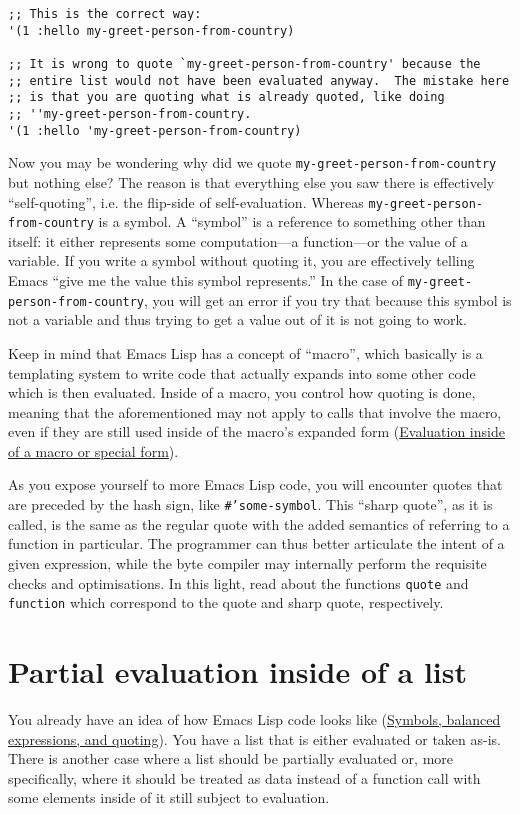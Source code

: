 \documentclass[11pt]{ctexart}
\begin{document}
\begin{verbatim}
;; This is the correct way:
'(1 :hello my-greet-person-from-country)

;; It is wrong to quote `my-greet-person-from-country' because the
;; entire list would not have been evaluated anyway.  The mistake here
;; is that you are quoting what is already quoted, like doing
;; ''my-greet-person-from-country.
'(1 :hello 'my-greet-person-from-country)
\end{verbatim}

Now you may be wondering why did we quote \texttt{my-greet-person-from-country} but nothing else? The reason is that everything else you saw there is effectively ``self-quoting'', i.e. the flip-side of self-evaluation. Whereas \texttt{my-greet-person-from-country} is a symbol. A ``symbol'' is a reference to something other than itself: it either represents some computation---a function---or the value of a variable. If you write a symbol without quoting it, you are effectively telling Emacs ``give me the value this symbol represents.'' In the case of \texttt{my-greet-person-from-country}, you will get an error if you try that because this symbol is not a variable and thus trying to get a value out of it is not going to work.

Keep in mind that Emacs Lisp has a concept of ``macro'', which basically is a templating system to write code that actually expands into some other code which is then evaluated. Inside of a macro, you control how quoting is done, meaning that the aforementioned may not apply to calls that involve the macro, even if they are still used inside of the macro's expanded form (\hyperref[sec:org61e1a1b]{Evaluation inside of a macro or special form}).

As you expose yourself to more Emacs Lisp code, you will encounter quotes that are preceded by the hash sign, like \texttt{\#'some-symbol}. This ``sharp quote'', as it is called, is the same as the regular quote with the added semantics of referring to a function in particular. The programmer can thus better articulate the intent of a given expression, while the byte compiler may internally perform the requisite checks and optimisations. In this light, read about the functions \texttt{quote} and \texttt{function} which correspond to the quote and sharp quote, respectively.
\section{Partial evaluation inside of a list}
\label{sec:org771b57a}
You already have an idea of how Emacs Lisp code looks like (\hyperref[sec:org9b7817a]{Symbols, balanced expressions, and quoting}). You have a list that is either evaluated or taken as-is. There is another case where a list should be partially evaluated or, more specifically, where it should be treated as data instead of a function call with some elements inside of it still subject to evaluation.
\end{document}
